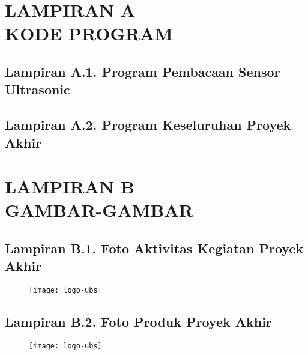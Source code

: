 
\appendix
\chapter*{LAMPIRAN A \\ KODE PROGRAM}

\section*{Lampiran A.1. Program Pembacaan Sensor Ultrasonic}
%

\hfill

\section*{Lampiran A.2. Program Keseluruhan Proyek Akhir}
%

\chapter*{LAMPIRAN B \\ GAMBAR-GAMBAR}

\section*{Lampiran B.1. Foto Aktivitas Kegiatan Proyek Akhir}
\begin{figure}[H]
    \centering
    \texttt{[image: logo-ubs]}
\end{figure}

\hfill

\section*{Lampiran B.2. Foto Produk Proyek Akhir}
\begin{figure}[H]
    \centering
    \texttt{[image: logo-ubs]}
\end{figure}
